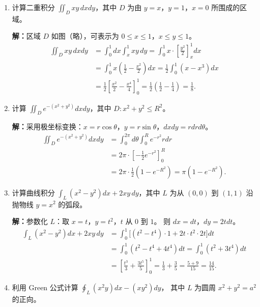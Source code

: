 \documentclass[12pt,a4paper]{ctexart}
\begin{document}
\begin{enumerate}[leftmargin=*,label=\arabic*.,start=41]
  \item 计算二重积分 $\displaystyle\iint_D xy \,dxdy$，其中 $D$ 为由 $y=x$，$y=1$，$x=0$ 所围成的区域。

    \textbf{解：}区域 $D$ 如图（略），可表示为 $0 \le x \le 1$，$x \le y \le 1$。
    \begin{align*}
      \iint_D xy \,dxdy
      &= \int_0^1 dx \int_x^1 xy \,dy
       = \int_0^1 x \cdot \left[\frac{y^2}{2}\right]_x^1 dx \\
      &= \int_0^1 x\left(\frac{1}{2} - \frac{x^2}{2}\right) dx
       = \frac{1}{2}\int_0^1 (x - x^3) dx \\
      &= \frac{1}{2}\left[\frac{x^2}{2} - \frac{x^4}{4}\right]_0^1
       = \frac{1}{2}\left(\frac{1}{2} - \frac{1}{4}\right)
       = \frac{1}{8}.
    \end{align*}

  \item 计算 $\displaystyle\iint_D e^{-(x^2+y^2)} dxdy$，其中 $D: x^2+y^2 \le R^2$。

    \textbf{解：}采用极坐标变换：$x=r\cos\theta$，$y=r\sin\theta$，$dxdy = r dr d\theta$。
    \begin{align*}
      \iint_D e^{-(x^2+y^2)} dxdy
      &= \int_0^{2\pi} d\theta \int_0^R e^{-r^2} r dr \\
      &= 2\pi \cdot \left[-\frac{1}{2}e^{-r^2}\right]_0^R \\
      &= 2\pi \cdot \frac{1}{2}(1 - e^{-R^2})
       = \pi(1 - e^{-R^2}).
    \end{align*}

  \item 计算曲线积分 $\displaystyle\int_L (x^2-y^2)dx + 2xy\,dy$，其中 $L$ 为从 $(0,0)$ 到 $(1,1)$
    沿抛物线 $y=x^2$ 的弧段。

    \textbf{解：}参数化 $L$：取 $x=t$，$y=t^2$，$t$ 从 $0$ 到 $1$。
    则 $dx = dt$，$dy = 2t dt$。
    \begin{align*}
      \int_L (x^2-y^2)dx + 2xy\,dy
      &= \int_0^1 \bigl[(t^2 - t^4) \cdot 1 + 2t\cdot t^2 \cdot 2t\bigr] dt \\
      &= \int_0^1 (t^2 - t^4 + 4t^4) dt
       = \int_0^1 (t^2 + 3t^4) dt \\
      &= \left[\frac{t^3}{3} + \frac{3t^5}{5}\right]_0^1
       = \frac{1}{3} + \frac{3}{5}
       = \frac{5+9}{15}
       = \frac{14}{15}.
    \end{align*}

  \item 利用 Green 公式计算 $\displaystyle\oint_L (x^2y)dx - (xy^2)dy$，
    其中 $L$ 为圆周 $x^2+y^2 = a^2$ 的正向。


\end{enumerate}
\end{document}

